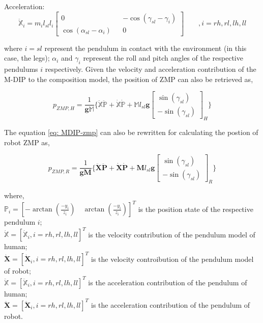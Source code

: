 Acceleration:
\begin{equation}
    \label{eq: MDIP-acceleration}
    \ddot{\mathbb{X}}_i = m_il_{sl}l_i\begin{bmatrix}
        0 && -\cos(\gamma_{sl} - \gamma_i) \\
        \cos(\alpha_{sl} - \alpha_i) && 0
    \end{bmatrix} \qquad \mathit{,i = rh, rl, lh, ll}
\end{equation}

where $i=sl$ represent the pendulum in contact with the environment (in this case, the legs); $\alpha_i$ and $\gamma_i$
represent the roll and pitch angles of the respective pendulums $i$ respectively. Given the velocity and acceleration contribution of the M-DIP to the composition model, the position of ZMP can also be retrieved
as, 

\begin{equation}
    \label{eq: MDIP-zmp}
    p_{ZMP, H} = \frac{1}{\mathbf{g}\mathbb{M}}\{\mathbb{\ddot{X}}\mathbb{\ddot{P}} + \mathbb{\dot{X}}\mathbb{\dot{P}} + \mathbb{M}l_{sl}\mathbf{g}\begin{bmatrix}
        \sin(\gamma_{sl}) \\
        -\sin(\gamma_{sl})
    \end{bmatrix}_{H}\}
\end{equation}

The equation \ref{eq: MDIP-zmp} can also be rewritten for calculating the postion of robot ZMP as,

\begin{equation}
    \label{eq: MDIP-robot-zmp}
    p_{ZMP, R} = \frac{1}{\mathbf{g}\mathbf{M}}\{\mathbf{\ddot{X}}\mathbf{\ddot{P}} + \mathbf{\dot{X}}\mathbf{\dot{P}} + \mathbf{M}l_{sl}\mathbf{g}\begin{bmatrix}
        \sin(\gamma_{sl}) \\
        -\sin(\gamma_{sl})
    \end{bmatrix}_{R}\}
\end{equation}

where,
\\
$\mathbb{P}_{i} = [-\arctan(\frac{-y_i}{z_i}) \quad \arctan(\frac{-y_i}{z_i})]^T$ is the position state of the respective pendulum $i$; \\
$\mathbb{\dot{X}} = [\mathbb{\dot{X}}_i, \mathit{i = rh, rl, lh, ll}]^T$ is the velocity contribution of the pendulum model of human; \\
$\mathbf{\dot{X}} = [\mathbf{\dot{X}}_i, \mathit{i = rh, rl, lh, ll}]^T$ is the velocity controibution of the pendulum model of robot; \\
$\mathbb{\ddot{X}} = [\mathbb{\ddot{X}}_i, \mathit{i = rh, rl, lh, ll}]^T$ is the acceleration contribution of the pendulum of human; \\
$\mathbf{\ddot{X}} = [\mathbf{\ddot{X}}_i, \mathit{i = rh, rl, lh, ll}]^T$ is the acceleration contribution of the pendulum of robot.


